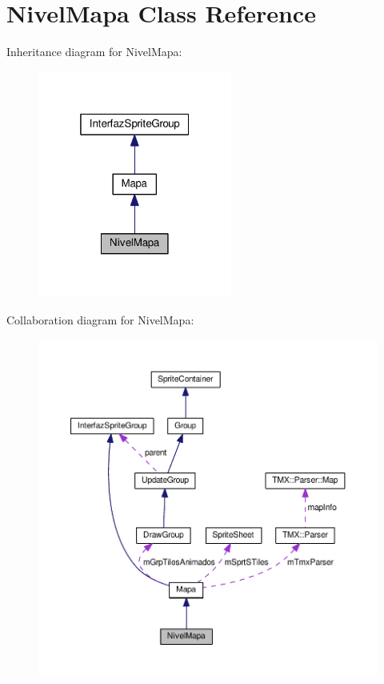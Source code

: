 \hypertarget{class_nivel_mapa}{}\section{Nivel\+Mapa Class Reference}
\label{class_nivel_mapa}


Inheritance diagram for Nivel\+Mapa\+:
\nopagebreak
\begin{figure}[H]
\begin{center}
\leavevmode
\includegraphics[width=181pt]{class_nivel_mapa__inherit__graph}
\end{center}
\end{figure}


Collaboration diagram for Nivel\+Mapa\+:
\nopagebreak
\begin{figure}[H]
\begin{center}
\leavevmode
\includegraphics[width=350pt]{class_nivel_mapa__coll__graph}
\end{center}
\end{figure}
